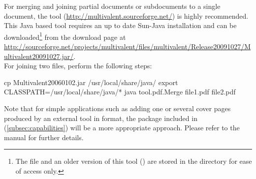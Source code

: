 For merging and joining partial documents or subdocuments to a single
 document, the  tool
(\url{http://multivalent.sourceforge.net/}) is highly recommended.  This
Java based tool requires an up to date Sun-Java installation and can be
downloaded\footnote{The file  and an older
  version of this tool () are stored in the
  directory  for ease of access only.}
from the  download page at
\url{http://sourceforge.net/projects/multivalent/files/multivalent/Release20091027/Multivalent20091027.jar/}.\\
For joining two  files, perform the following steps:
%
\begin{CommandLineListing}[print=true, gobble=0]
   cp Multivalent20060102.jar /usr/local/share/java/
   export CLASSPATH=/usr/local/share/java/*
   java tool.pdf.Merge file1.pdf file2.pdf
\end{CommandLineListing}

Note that for simple applications such as adding one or several cover pages
produced by an external tool in  format, the 
package included in \wegcLaTeX{} (\autoref{subsec:capabilities}) will be a
more appropriate approach. Please refer to the  manual for
further details.
